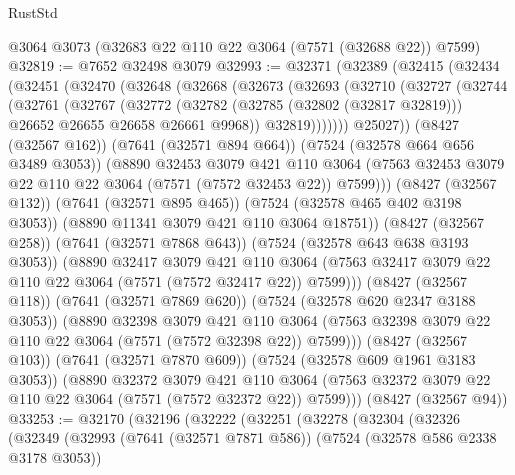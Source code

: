 \begin{lexlean}{RustStd}
\begin{coremodule}
    @3064
    @3073
    (@32683 @22 @110 @22 @3064 (@7571 (@32688 @22)) @7599)
@32819 := @7652 @32498 @3079
@32993 := @32371
    (@32389
      (@32415
        (@32434
          (@32451
            (@32470
              (@32648
                (@32668
                  (@32673
                    (@32693
                      (@32710
                        (@32727
                          (@32744
                            (@32761
                              (@32767
                                (@32772
                                  (@32782
                                    (@32785 (@32802 (@32817 @32819)))
                                    @26652
                                    @26655
                                    @26658
                                    @26661
                                    @9968))
                                @32819)))))))
                  @25027))
              (@8427 (@32567 @162))
              (@7641 (@32571 @894 @664))
              (@7524 (@32578 @664 @656 @3489 @3053))
              (@8890
                @32453
                @3079
                @421
                @110
                @3064
                (@7563 @32453 @3079 @22 @110 @22 @3064 (@7571 (@7572 @32453 @22)) @7599)))
            (@8427 (@32567 @132))
            (@7641 (@32571 @895 @465))
            (@7524 (@32578 @465 @402 @3198 @3053))
            (@8890 @11341 @3079 @421 @110 @3064 @18751))
          (@8427 (@32567 @258))
          (@7641 (@32571 @7868 @643))
          (@7524 (@32578 @643 @638 @3193 @3053))
          (@8890
            @32417
            @3079
            @421
            @110
            @3064
            (@7563 @32417 @3079 @22 @110 @22 @3064 (@7571 (@7572 @32417 @22)) @7599)))
        (@8427 (@32567 @118))
        (@7641 (@32571 @7869 @620))
        (@7524 (@32578 @620 @2347 @3188 @3053))
        (@8890
          @32398
          @3079
          @421
          @110
          @3064
          (@7563 @32398 @3079 @22 @110 @22 @3064 (@7571 (@7572 @32398 @22)) @7599)))
      (@8427 (@32567 @103))
      (@7641 (@32571 @7870 @609))
      (@7524 (@32578 @609 @1961 @3183 @3053))
      (@8890
        @32372
        @3079
        @421
        @110
        @3064
        (@7563 @32372 @3079 @22 @110 @22 @3064 (@7571 (@7572 @32372 @22)) @7599)))
    (@8427 (@32567 @94))
@33253 := @32170
    (@32196
      (@32222
        (@32251
          (@32278
            (@32304
              (@32326
                (@32349
                  (@32993
                    (@7641 (@32571 @7871 @586))
                    (@7524 (@32578 @586 @2338 @3178 @3053))

\end{coremodule}
\end{lexlean}
